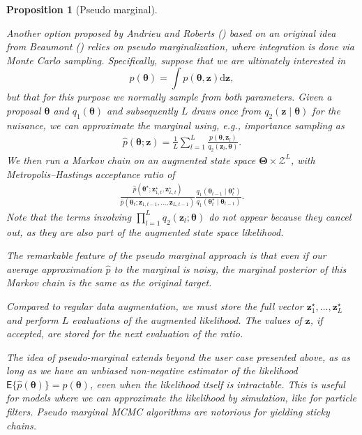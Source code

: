 \documentclass[
  11pt,
  letterpaper,
]{scrbook}
\theoremstyle{definition}
\theoremstyle{plain}
\newtheorem{proposition}{Proposition}[chapter]
\theoremstyle{plain}
\theoremstyle{plain}
\theoremstyle{definition}
\theoremstyle{definition}
\theoremstyle{plain}
\newtheorem{proposition}{Proposition}[chapter]
\theoremstyle{plain}
\theoremstyle{remark}
\begin{document}
\begin{proposition}[Pseudo
marginal]\protect\hypertarget{prp-pseudo-marginal}{}\label{prp-pseudo-marginal}

Another option proposed by Andrieu and Roberts
() based on an original idea
from Beaumont () relies on pseudo
marginalization, where integration is done via Monte Carlo sampling.
Specifically, suppose that we are ultimately interested in
\[p(\boldsymbol{\theta})= \int p(\boldsymbol{\theta}, \boldsymbol{z}) \mathrm{d} \boldsymbol{z},\]
but that for this purpose we normally sample from both parameters. Given
a proposal \(\boldsymbol{\theta}\) and \(q_1(\boldsymbol{\theta})\) and
subsequently \(L\) draws once from
\(q_2(\boldsymbol{z} \mid \boldsymbol{\theta})\) for the nuisance, we
can approximate the marginal using, e.g., importance sampling as
\begin{align*}
\widehat{p}(\boldsymbol{\theta}; \boldsymbol{z}) = \frac{1}{L} \sum_{l=1}^L \frac{p(\boldsymbol{\theta}, \boldsymbol{z}_l)}{q_2(\boldsymbol{z}_l, \boldsymbol{\theta})}.
\end{align*} We then run a Markov chain on an augmented state space
\(\boldsymbol{\Theta} \times \mathcal{Z}^L\), with Metropolis--Hastings
acceptance ratio of \begin{align*}
\frac{\widehat{p}(\boldsymbol{\theta}^{\star}; \boldsymbol{z}_{1,t}^{\star}, \boldsymbol{z}_{L,t}^{\star})}{
\widehat{p}(\boldsymbol{\theta}_t; \boldsymbol{z}_{1,t-1}, \ldots, \boldsymbol{z}_{L, t-1})}\frac{q_1(\boldsymbol{\theta}_{t-1} \mid \boldsymbol{\theta}^{\star}_t)}{q_1(\boldsymbol{\theta}^{\star}_t \mid \boldsymbol{\theta}_{t-1})}.
\end{align*} Note that the terms involving
\(\prod_{l=1}^L q_2(\boldsymbol{z}_{l}; \boldsymbol{\theta})\) do not
appear because they cancel out, as they are also part of the augmented
state space likelihood.

The remarkable feature of the pseudo marginal approach is that even if
our average approximation \(\widehat{p}\) to the marginal is noisy, the
marginal posterior of this Markov chain is the same as the original
target.

Compared to regular data augmentation, we must store the full vector
\(\boldsymbol{z}^{\star}_1, \ldots, \boldsymbol{z}^{\star}_L\) and
perform \(L\) evaluations of the augmented likelihood. The values of
\(\boldsymbol{z}\), if accepted, are stored for the next evaluation of
the ratio.

The idea of pseudo-marginal extends beyond the user case presented
above, as as long as we have an unbiased non-negative estimator of the
likelihood
\(\mathsf{E}\{\widehat{p}(\boldsymbol{\theta})\}=p(\boldsymbol{\theta})\),
even when the likelihood itself is intractable. This is useful for
models where we can approximate the likelihood by simulation, like for
particle filters. Pseudo marginal MCMC algorithms are notorious for
yielding sticky chains.

\end{proposition}
\end{document}
